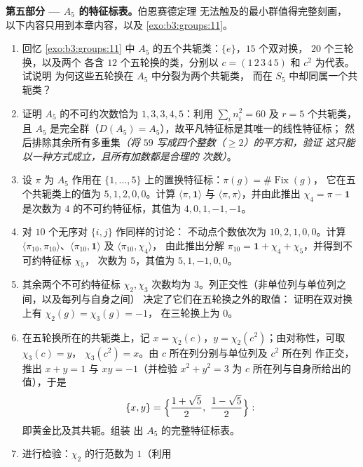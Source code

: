 \begin{problem}
\medskip
\noindent\textbf{第五部分 --- $A_5$ 的特征标表。}伯恩赛德定理
       无法触及的最小群值得完整刻画，
       以下内容只用到本章内容，以及
       \cref{exo:b3:groups:11}。
\begin{enumerate}[resume]
  \item 回忆 \cref{exo:b3:groups:11} 中
        $A_5$ 的五个共轭类：$\{e\}$，$15$ 个双对换，
        $20$ 个三轮换，以及两个
        各含 $12$ 个五轮换的类，分别以 $c =
        (1\,2\,3\,4\,5)$ 和 $c^2$ 为代表。试说明
        为何这些五轮换在 $A_5$ 中分裂为两个共轭类，
        而在 $S_5$ 中却同属一个共轭类？
  \item 证明 $A_5$ 的不可约次数恰为
        $1, 3, 3, 4, 5$：利用 $\sum_in_i^2 = 60$ 及 $r = 5$
        个共轭类，且 $A_5$ 是完全群（$D(A_5) =
        A_5$），故平凡特征标是其唯一的线性特征标；
        然后排除其余所有多重集\emph{（将 $59$
        写成四个整数（$\geq 2$）的平方和，验证
        这只能以一种方式成立，且所有加数都是合理的
        次数）}。
  \item 设 $\pi$ 为 $A_5$ 作用在
        $\{1, \dots, 5\}$ 上的置换特征标：$\pi(g) = \#\operatorname{Fix}(g)$，
        它在五个共轭类上的值为 $5, 1, 2, 0, 0$。计算
        $\langle\pi, \mathbf 1\rangle$ 与 $\langle\pi,
        \pi\rangle$，并由此推出 $\chi_4 = \pi - \mathbf 1$
        是次数为 $4$ 的不可约特征标，其值为 $4, 0, 1, -1,
        -1$。
  \item 对 $10$ 个无序对 $\{i, j\}$ 作同样的讨论：
        不动点个数依次为 $10, 2, 1, 0, 0$。计算
        $\langle\pi_{10}, \pi_{10}\rangle$、$\langle\pi_{10},
        \mathbf 1\rangle$ 及 $\langle\pi_{10}, \chi_4\rangle$，
        由此推出分解 $\pi_{10} = \mathbf 1 + \chi_4
        + \chi_5$，并得到不可约特征标 $\chi_5$，
        次数为 $5$，其值为 $5, 1, -1, 0, 0$。
  \item 其余两个不可约特征标 $\chi_2, \chi_3$ 次数均为
        $3$。列正交性（非单位列与单位列之间，以及每列与自身之间）
        决定了它们在五轮换之外的取值：
        证明在双对换上有
        $\chi_2(g) = \chi_3(g) = -1$，
        在三轮换上为 $0$。
  \item 在五轮换所在的共轭类上，记 $x = \chi_2(c)$，$y =
        \chi_2(c^2)$；由对称性，可取 $\chi_3(c) = y$，
        $\chi_3(c^2) = x$。由 $c$ 所在列分别与单位列及 $c^2$ 所在列
        作正交，推出
        $x + y = 1$ 与 $xy = -1$（并检验 $x^2 +
        y^2 = 3$ 为 $c$ 所在列与自身所给出的值），于是
        \[
        \{x, y\} = \Bigl\{\frac{1 + \sqrt5}2,\ \frac{1 -
        \sqrt5}2\Bigr\} :
        \]
        即黄金比及其共轭。组装
        出 $A_5$ 的完整特征标表。
  \item 进行检验：$\chi_2$ 的行范数为 $1$（利用

\end{enumerate}
\end{problem}

